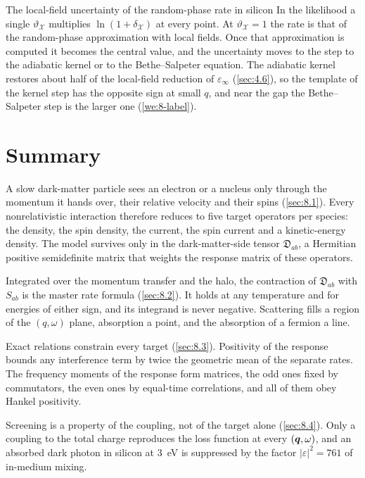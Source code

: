 \begin{workedexample}{The local-field uncertainty of the random-phase rate in silicon}
In the likelihood a single $\vartheta_{\mathcal{X}}$ multiplies $\ln(1 + \delta_{\mathcal{X}})$ at every point. At $\vartheta_{\mathcal{X}} = 1$ the rate is that of the random-phase approximation with local fields. Once that approximation is computed it becomes the central value, and the uncertainty moves to the step to the adiabatic kernel or to the Bethe--Salpeter equation. The adiabatic kernel restores about half of the local-field reduction of $\varepsilon_\infty$ (\cref{sec:4.6}), so the template of the kernel step has the opposite sign at small $q$, and near the gap the Bethe--Salpeter step is the larger one (\cref{we:8-label}).
\end{workedexample}

\section*{Summary}

A slow dark-matter particle sees an electron or a nucleus only through the momentum it hands over, their relative velocity and their spins (\cref{sec:8.1}). Every nonrelativistic interaction therefore reduces to five target operators per species: the density, the spin density, the current, the spin current and a kinetic-energy density. The model survives only in the dark-matter-side tensor $\mathfrak{D}_{ab}$, a Hermitian positive semidefinite matrix that weights the response matrix of these operators.

Integrated over the momentum transfer and the halo, the contraction of $\mathfrak{D}_{ab}$ with $S_{ab}$ is the master rate formula (\cref{sec:8.2}). It holds at any temperature and for energies of either sign, and its integrand is never negative. Scattering fills a region of the $(q,\omega)$ plane, absorption a point, and the absorption of a fermion a line.

Exact relations constrain every target (\cref{sec:8.3}). Positivity of the response bounds any interference term by twice the geometric mean of the separate rates. The frequency moments of the response form matrices, the odd ones fixed by commutators, the even ones by equal-time correlations, and all of them obey Hankel positivity.

Screening is a property of the coupling, not of the target alone (\cref{sec:8.4}). Only a coupling to the total charge reproduces the loss function at every $(\bm{q},\omega)$, and an absorbed dark photon in silicon at \SI{3}{eV} is suppressed by the factor $|\varepsilon|^2 = 761$ of in-medium mixing.

